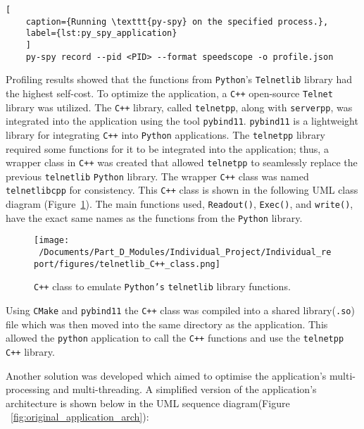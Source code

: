\begin{lstlisting}[
	caption={Running \texttt{py-spy} on the specified process.},
	label={lst:py_spy_application}
	]
	py-spy record --pid <PID> --format speedscope -o profile.json 
\end{lstlisting}


Profiling results showed that the functions from \texttt{Python}'s \texttt{Telnetlib} library had the highest self-cost. To optimize the application, a \texttt{C++} open-source \texttt{Telnet} library was utilized. The \texttt{C++} library, called \texttt{telnetpp},\cite{telnetpp_library} along with \texttt{serverpp},\cite{serverpp_library} was integrated into the application using the tool \texttt{pybind11}. \texttt{pybind11} is a lightweight library for integrating \texttt{C++} into \texttt{Python} applications. The \texttt{telnetpp} library required some functions for it to be integrated into the application; thus, a wrapper class in \texttt{C++} was created that allowed \texttt{telnetpp} to seamlessly replace the previous \texttt{telnetlib} \texttt{Python} library. The wrapper \texttt{C++} class was named \texttt{telnetlibcpp} for consistency. This \texttt{C++} class is shown in the following UML class diagram (Figure~\ref{fig:telnetlibcpp_UML}). The main functions used, \texttt{Readout()}, \texttt{Exec()}, and \texttt{write()}, have the exact same names as the functions from the \texttt{Python} library.

\begin{figure}[htbp] %
	\centering
	\texttt{[image: ~/Documents/Part\_D\_Modules/Individual\_Project/Individual\_report/figures/telnetlib\_C++\_class.png]} %
	\caption{\texttt{C++} class to emulate \texttt{Python's} \texttt{telnetlib} library functions.}
	\label{fig:telnetlibcpp_UML} %
\end{figure}

Using \texttt{CMake} and \texttt{pybind11} the \texttt{C++} class was compiled into a shared library(\texttt{.so}) file which was then moved into the same directory as the application. This allowed the \texttt{python} application to call the \texttt{C++} functions and use the \texttt{telnetpp} \texttt{C++} library. 

Another solution was developed which aimed to optimise the application's multi-processing and multi-threading. A simplified version of the application's architecture is shown below in the UML sequence diagram(Figure ~\ref{fig:original_application_arch}):


